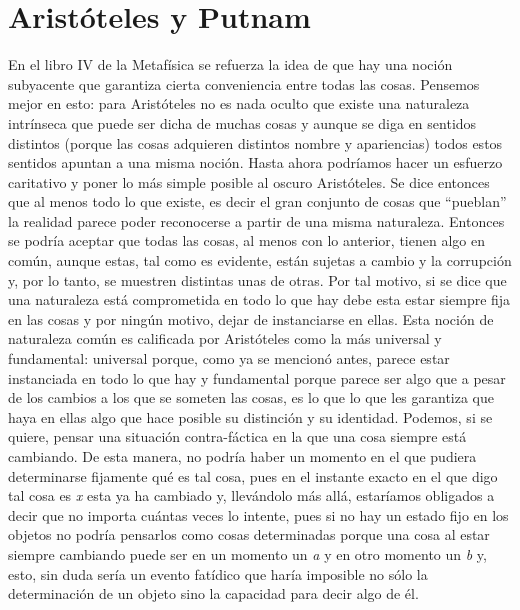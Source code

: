 \documentclass[]{book}
\begin{document}
\section*{Aristóteles y Putnam}

En el libro IV de la Metafísica se refuerza la idea de que hay una
noción subyacente que garantiza cierta conveniencia entre todas las
cosas. Pensemos mejor en esto: para Aristóteles no es nada oculto que
existe una naturaleza intrínseca que puede ser dicha de muchas cosas y
aunque se diga en sentidos distintos (porque las cosas adquieren
distintos nombre y apariencias) todos estos sentidos apuntan a una misma
noción. Hasta ahora podríamos hacer un esfuerzo caritativo y poner lo
más simple posible al oscuro Aristóteles. Se dice entonces que al menos
todo lo que existe, es decir el gran conjunto de cosas que ``pueblan''
la realidad parece poder reconocerse a partir de una misma naturaleza.
Entonces se podría aceptar que todas las cosas, al menos con lo
anterior, tienen algo en común, aunque estas, tal como es evidente,
están sujetas a cambio y la corrupción y, por lo tanto, se muestren
distintas unas de otras. Por tal motivo, si se dice que una naturaleza
está comprometida en todo lo que hay debe esta estar siempre fija en las
cosas y por ningún motivo, dejar de instanciarse en ellas. Esta noción
de naturaleza común es calificada por Aristóteles como la más universal
y fundamental: universal porque, como ya se mencionó antes, parece estar
instanciada en todo lo que hay y fundamental porque parece ser algo que
a pesar de los cambios a los que se someten las cosas, es lo que lo que
les garantiza que haya en ellas algo que hace posible su distinción y su
identidad. Podemos, si se quiere, pensar una situación contra-fáctica en
la que una cosa siempre está cambiando. De esta manera, no podría haber
un momento en el que pudiera determinarse fijamente qué es tal cosa,
pues en el instante exacto en el que digo tal cosa es \emph{x} esta ya
ha cambiado y, llevándolo más allá, estaríamos obligados a decir que no
importa cuántas veces lo intente, pues si no hay un estado fijo en los
objetos no podría pensarlos como cosas determinadas porque una cosa al
estar siempre cambiando puede ser en un momento un \emph{a} y en otro
momento un \emph{b} y, esto, sin duda sería un evento fatídico que haría
imposible no sólo la determinación de un objeto sino la capacidad para
decir algo de él.
\end{document}
